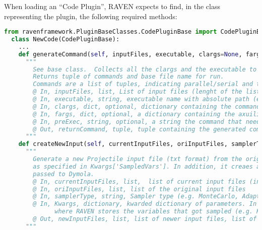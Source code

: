 When loading an ``Code Plugin'', RAVEN expects to find, in the class
representing the plugin, the following required methods:
\begin{lstlisting}[language=python, basicstyle=\scriptsize\ttfamily, breaklines=True, columns=fullflexible]
  from ravenframework.PluginBaseClasses.CodePluginBase import CodePluginBase
  class NewCode(CodePluginBase):
    ...
    def generateCommand(self, inputFiles, executable, clargs=None, fargs=None, preExec=None):
      """
        See base class.  Collects all the clargs and the executable to produce the command-line call.
        Returns tuple of commands and base file name for run.
        Commands are a list of tuples, indicating parallel/serial and the execution command to use.
        @ In, inputFiles, list, List of input files (lenght of the list depends on the number of inputs have been added in the Step is running this code)
        @ In, executable, string, executable name with absolute path (e.g. /home/path_to_executable/code.exe)
        @ In, clargs, dict, optional, dictionary containing the command-line flags the user can specify in the input (e.g. under the node < Code >< clargstype =0 input0arg =0 i0extension =0 .inp0/ >< /Code >)
        @ In, fargs, dict, optional, a dictionary containing the axuiliary input file variables the user can specify in the input (e.g. under the node < Code >< clargstype =0 input0arg =0 aux0extension =0 .aux0/ >< /Code >)
        @ In, preExec, string, optional, a string the command that needs to be pre-executed before the actual command here defined
        @ Out, returnCommand, tuple, tuple containing the generated command. returnCommand[0] is the command to run the code (string), returnCommand[1] is the name of the output root
      """
    def createNewInput(self, currentInputFiles, oriInputFiles, samplerType, **Kwargs):
      """
        Generate a new Projectile input file (txt format) from the original, changing parameters
        as specified in Kwargs['SampledVars']. In addition, it creaes an additional input file including the vector data to be
        passed to Dymola.
        @ In, currentInputFiles, list,  list of current input files (input files from last this method call)
        @ In, oriInputFiles, list, list of the original input files
        @ In, samplerType, string, Sampler type (e.g. MonteCarlo, Adaptive, etc. see manual Samplers section)
        @ In, Kwargs, dictionary, kwarded dictionary of parameters. In this dictionary there is another dictionary called "SampledVars"
              where RAVEN stores the variables that got sampled (e.g. Kwargs['SampledVars'] => {'var1':10,'var2':40})
        @ Out, newInputFiles, list, list of newer input files, list of the new input files (modified and not)
      """

\end{lstlisting}
